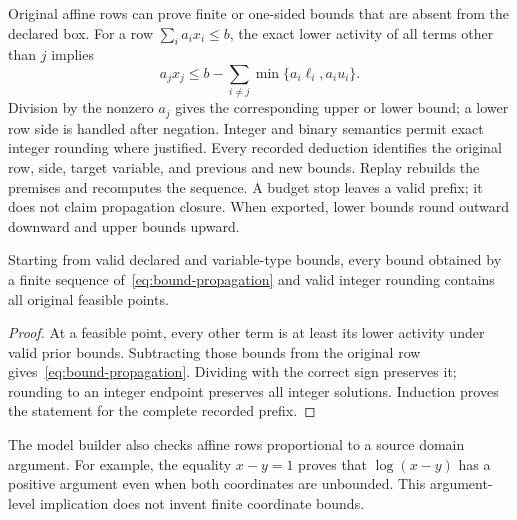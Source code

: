 Original affine rows can prove finite or one-sided bounds that are absent
from the declared box. For a row $\sum_i a_ix_i\le b$, the exact
lower activity of all terms other than $j$ implies
\begin{equation}\label{eq:bound-propagation}
a_jx_j\le b-\sum_{i\ne j}\min\{a_i\ell_i,a_iu_i\}.
\end{equation}
Division by the nonzero $a_j$ gives the corresponding upper or lower
bound; a lower row side is handled after negation. Integer and binary
semantics permit exact integer rounding where justified. Every recorded
deduction identifies the original row, side, target variable, and previous
and new bounds. Replay rebuilds the premises and recomputes the sequence.
A budget stop leaves a valid prefix; it does not claim propagation closure.
When exported, lower bounds round outward downward and upper bounds upward.

\begin{proposition}\label{prop:affine-bounds}
Starting from valid declared and variable-type bounds, every bound obtained
by a finite sequence of~\eqref{eq:bound-propagation} and valid integer
rounding contains all original feasible points.
\end{proposition}
\begin{proof}
At a feasible point, every other term is at least its lower activity
under valid prior bounds. Subtracting those bounds from the original row
gives~\eqref{eq:bound-propagation}. Dividing with the correct sign
preserves it; rounding to an integer endpoint preserves all integer
solutions. Induction proves the statement for the complete recorded prefix.
\end{proof}

The model builder also checks affine rows proportional to a source domain
argument. For example, the equality $x-y=1$ proves that $\log(x-y)$
has a positive argument even when both coordinates are unbounded. This
argument-level implication does not invent finite coordinate bounds.

